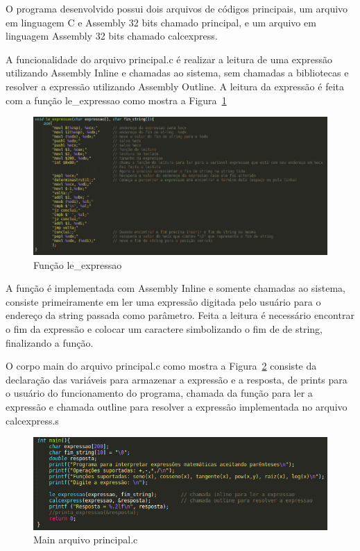 \documentclass[12pt]{article}
\begin{document}
O programa desenvolvido possui dois arquivos de códigos principais, um arquivo em linguagem C e Assembly 32 bits chamado principal, e um arquivo em linguagem Assembly 32 bits chamado calcexpress.

A funcionalidade do arquivo principal.c é realizar a leitura de uma expressão utilizando Assembly Inline e chamadas ao sistema, sem chamadas a bibliotecas e resolver a expressão utilizando Assembly Outline. A leitura da expressão é feita com a função le\_expressao como mostra a Figura~\ref{le_expressao}

\begin{figure}[H]
\centering
\includegraphics[width=\textwidth]{Imagens/le_expressao.png}
\caption{Função le\_expressao}
\label{le_expressao}
\end{figure}

A função é implementada com Assembly Inline e somente chamadas ao sistema, consiste primeiramente em ler uma expressão digitada pelo usuário para o endereço da string passada como parâmetro. Feita a leitura é necessário encontrar o fim da expressão e colocar um caractere simbolizando o fim de de string, finalizando a função.

O corpo main do arquivo principal.c como mostra a Figura~\ref{principal} consiste da declaração das variáveis para armazenar a expressão e a resposta, de prints para o usuário do funcionamento do programa, chamada da função para ler a expressão e chamada outline para resolver a expressão implementada no arquivo calcexpress.s

\begin{figure}[H]
\centering
\includegraphics[width=\textwidth]{Imagens/principal.png}
\caption{Main arquivo principal.c}
\label{principal}
\end{figure}
\end{document}
